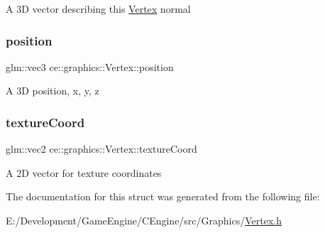 A 3D vector describing this \hyperlink{structce_1_1graphics_1_1_vertex}{Vertex} normal \mbox{\label{structce_1_1graphics_1_1_vertex_aa38ddb0b29a672e67e790869f38282ff}} 
\subsubsection{\texorpdfstring{position}{position}}
{\footnotesize\ttfamily glm\+::vec3 ce\+::graphics\+::\+Vertex\+::position}

A 3D position, x, y, z \mbox{\label{structce_1_1graphics_1_1_vertex_a1dd8f6082878c241afc66226b3c45ea0}} 
\subsubsection{\texorpdfstring{texture\+Coord}{textureCoord}}
{\footnotesize\ttfamily glm\+::vec2 ce\+::graphics\+::\+Vertex\+::texture\+Coord}

A 2D vector for texture coordinates 

The documentation for this struct was generated from the following file\+:\begin{DoxyCompactItemize}
\item 
E\+:/\+Development/\+Game\+Engine/\+C\+Engine/src/\+Graphics/\hyperlink{_vertex_8h}{Vertex.\+h}\end{DoxyCompactItemize}

